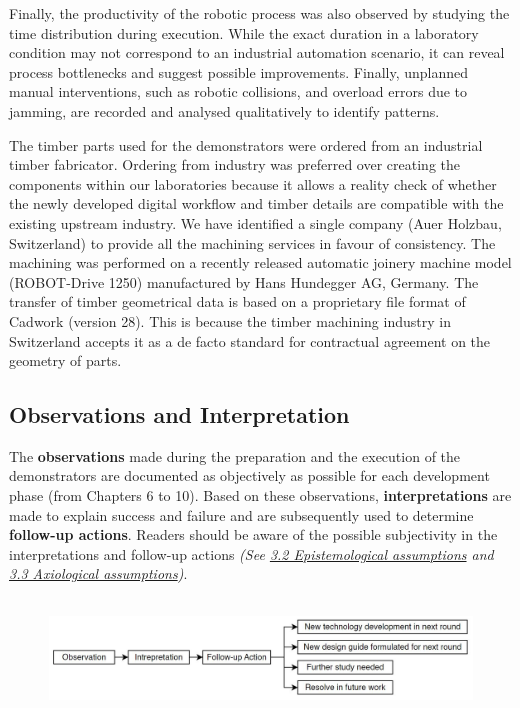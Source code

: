 \documentclass[11pt]{book}
\begin{document}
Finally, the productivity of the robotic process was also observed by studying the time distribution during execution. While the exact duration in a laboratory condition may not correspond to an industrial automation scenario, it can reveal process bottlenecks and suggest possible improvements. Finally, unplanned manual interventions, such as robotic collisions, and overload errors due to jamming, are recorded and analysed qualitatively to identify patterns.

The timber parts used for the demonstrators were ordered from an industrial timber fabricator. Ordering from industry was preferred over creating the components within our laboratories because it allows a reality check of whether the newly developed digital workflow and timber details are compatible with the existing upstream industry. We have identified a single company (Auer Holzbau, Switzerland) to provide all the machining services in favour of consistency. The machining was performed on a recently released automatic joinery machine model (ROBOT-Drive 1250) manufactured by Hans Hundegger AG, Germany. The transfer of timber geometrical data is based on a proprietary file format of Cadwork (version 28). This is because the timber machining industry in Switzerland accepts it as a de facto standard for contractual agreement on the geometry of parts.

\subsection{Observations and Interpretation}

The \textbf{observations }made during the preparation and the execution of the demonstrators are documented as objectively as possible for each development phase (from Chapters 6 to 10). Based on these observations, \textbf{interpretations }are made to explain success and failure and are subsequently used to determine \textbf{follow-up actions}. Readers should be aware of the possible subjectivity in the interpretations and follow-up actions \textit{(See \underline{3.2 Epistemological assumptions} and \underline{3.3 Axiological assumptions})}. 

\begin{figure}[H]
\includegraphics[width=15.92cm,height=3.17cm]{./images/image10.jpg}
\end{figure}
\end{document}
